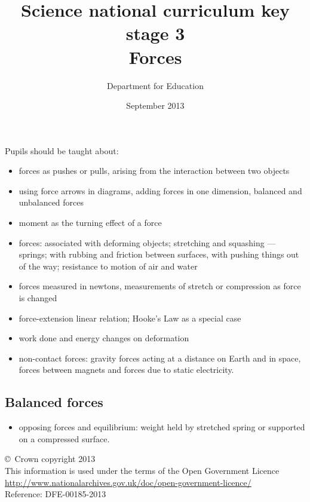 \documentclass[a4paper,12pt]{article}
\begin{document}
\setcounter{secnumdepth}{0}

\title{Science national curriculum key stage 3\\Forces}
\author{Department for Education}
\date{September 2013}
\maketitle

\thispagestyle{empty}

Pupils should be taught about:

\begin{itemize}
\item forces as pushes or pulls, arising from the interaction between two objects
\item using force arrows in diagrams, adding forces in one dimension, balanced and
unbalanced forces
\item moment as the turning effect of a force
\item forces: associated with deforming objects; stretching and squashing --- springs; with
rubbing and friction between surfaces, with pushing things out of the way; resistance to
motion of air and water
\item forces measured in newtons, measurements of stretch or compression as force is
changed
\item force-extension linear relation; Hooke's Law as a special case
\item work done and energy changes on deformation
\item non-contact forces: gravity forces acting at a distance on Earth and in space, forces
between magnets and forces due to static electricity.
\end{itemize}

\subsection{Balanced forces}
\begin{itemize}
\item opposing forces and equilibrium: weight held by stretched spring or supported on a
compressed surface.
\end{itemize}

\vfill

\footnotesize
\noindent \copyright\ Crown copyright 2013\\
This information is used under the terms of the Open Government Licence\\
\url{http://www.nationalarchives.gov.uk/doc/open-government-licence/}\\
{\tiny Reference: DFE-00185-2013}
\end{document}
